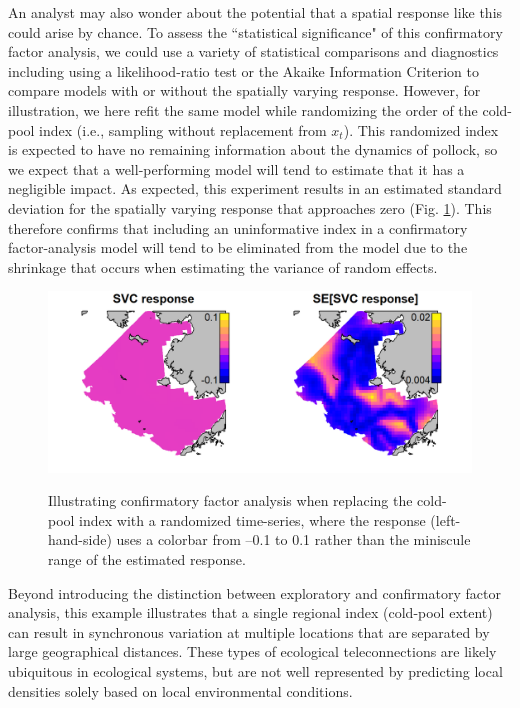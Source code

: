 An analyst may also wonder about the potential that a spatial response like this could arise by chance.  To assess the ``statistical significance" of this confirmatory factor analysis, we could use a variety of statistical comparisons and diagnostics including using a likelihood-ratio test or the Akaike Information Criterion \cite{akaike_new_1974} to compare models with or without the spatially varying response.  However, for illustration, we here refit the same model while randomizing the order of the cold-pool index (i.e., sampling without replacement from \(x_t\)).  This randomized index is expected to have no remaining information about the dynamics of pollock, so we expect that a well-performing model will tend to estimate that it has a negligible impact.  As expected, this experiment results in an estimated standard deviation for the spatially varying response that approaches zero (Fig. \ref{fig:Chap9_SVC_response_randomized}).  This therefore confirms that including an uninformative index in a confirmatory factor-analysis model will tend to be eliminated from the model due to the shrinkage that occurs when estimating the variance of random effects.    

\begin{figure}[!ht]
    \caption[Pollock response to a randomized time-series]{Illustrating confirmatory factor analysis when replacing the cold-pool index with a randomized time-series, where the response (left-hand-side) uses a colorbar from --0.1 to 0.1 rather than the miniscule range of the estimated response.}
    \centering
    \includegraphics[width=5.5in]{Chap_9/SVC_response_randomized.png}
    \label{fig:Chap9_SVC_response_randomized}
\end{figure}

Beyond introducing the distinction between exploratory and confirmatory factor analysis, this example illustrates that a single regional index (cold-pool extent) can result in synchronous variation at multiple locations that are separated by large geographical distances.  These types of ecological teleconnections are likely ubiquitous in ecological systems, but are not well represented by predicting local densities solely based on local environmental conditions.  

